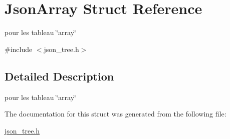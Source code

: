 \hypertarget{structJsonArray}{}\section{Json\+Array Struct Reference}
\label{structJsonArray}


pour les tableau \char`\"{}array\char`\"{}  




{\ttfamily \#include $<$json\+\_\+tree.\+h$>$}



\subsection{Detailed Description}
pour les tableau \char`\"{}array\char`\"{} 

The documentation for this struct was generated from the following file\+:\begin{DoxyCompactItemize}
\item 
\hyperlink{json__tree_8h}{json\+\_\+tree.\+h}\end{DoxyCompactItemize}

